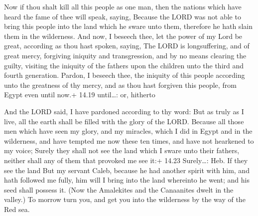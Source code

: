  Now if thou shalt kill all this people as one man, then
the nations which have heard the fame of thee will speak, saying,
 Because the LORD was not able to bring this people into
the land which he sware unto them, therefore he hath slain them in the
wilderness.  And now, I beseech thee, let the power of my
Lord be great, according as thou hast spoken, saying,  The
LORD is longsuffering, and of great mercy, forgiving iniquity and
transgression, and by no means clearing the guilty, visiting the
iniquity of the fathers upon the children unto the third and fourth
generation.  Pardon, I beseech thee, the iniquity of this
people according unto the greatness of thy mercy, and as thou hast
forgiven this people, from Egypt even until now.+ 14.19 until\ldots: or,
hitherto

 And the LORD said, I have pardoned according to thy word:
 But as truly as I live, all the earth shall be filled with
the glory of the LORD.  Because all those men which have
seen my glory, and my miracles, which I did in Egypt and in the
wilderness, and have tempted me now these ten times, and have not
hearkened to my voice;  Surely they shall not see the land
which I sware unto their fathers, neither shall any of them that
provoked me see it:+ 14.23 Surely\ldots: Heb. If they see the land
 But my servant Caleb, because he had another spirit with
him, and hath followed me fully, him will I bring into the land
whereinto he went; and his seed shall possess it.  (Now the
Amalekites and the Canaanites dwelt in the valley.) To morrow turn you,
and get you into the wilderness by the way of the Red sea.

